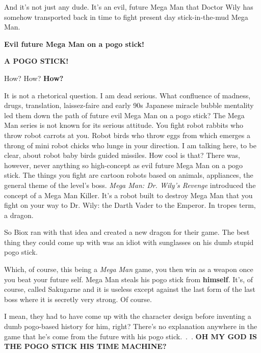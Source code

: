 \documentclass{book}
\let\oldcenter\center
\let\oldendcenter\endcenter
\renewenvironment{center}{\setlength\topsep{0pt}\oldcenter}{\oldendcenter}
\begin{document}
And it’s not just any dude. It’s an evil, future Mega Man that Doctor Wily has somehow transported back in time to fight present day stick-in-the-mud Mega Man.

\textbf{Evil future Mega Man on a pogo stick!}

\textbf{A POGO STICK!}

How? How? \textbf{How?}

It is not a rhetorical question. I am dead serious. What confluence of madness, drugs, translation, laissez-faire and early 90s Japanese miracle bubble mentality led them down the path of future evil Mega Man on a pogo stick? The Mega Man series is not known for its serious attitude. You fight robot rabbits who throw robot carrots at you. Robot birds who throw eggs from which emerges a throng of mini robot chicks who lunge in your direction. I am talking here, to be clear, about robot baby birds guided missiles. How cool is that? There was, however, never anything so high-concept as evil future Mega Man on a pogo stick. The things you fight are cartoon robots based on animals, appliances, the general theme of the level’s boss. \emph{Mega Man: Dr. Wily’s Revenge} introduced the concept of a Mega Man Killer. It’s a robot built to destroy Mega Man that you fight on your way to Dr. Wily: the Darth Vader to the Emperor. In tropes term, a dragon.

So Biox ran with that idea and created a new dragon for their game. The best thing they could come up with was an idiot with sunglasses on his dumb stupid pogo stick.

Which, of course, this being a \emph{Mega Man} game, you then win as a weapon once you beat your future self. Mega Man steals his pogo stick from \textbf{himself}. It’s, of course, called Sakugarne and it is useless except against the last form of the last boss where it is secretly very strong. Of course.

I mean, they had to have come up with the character design before inventing a dumb pogo-based history for him, right? There’s no explanation anywhere in the game that he’s come from the future with his pogo stick.~.~. \textbf{OH MY GOD IS THE POGO STICK HIS TIME MACHINE?}

\begin{center}
\quad\vspace{4pt}
\quad\vspace{4pt}
\quad\vspace{4pt}
\end{center}
\end{document}

